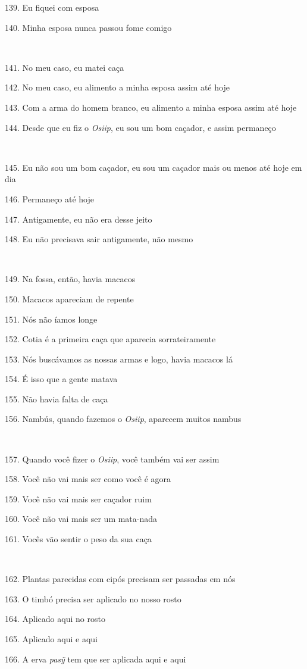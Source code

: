 139. Eu fiquei com esposa

140.  Minha esposa nunca passou fome comigo

~

141. No meu caso, eu matei caça

142. No meu caso, eu alimento a minha esposa assim até hoje

143. Com a arma do homem branco, eu alimento a minha esposa assim até hoje

144. Desde que eu fiz o \emph{Osiip}, eu sou um bom caçador, e assim permaneço

~

145. Eu não sou um bom caçador, eu sou um caçador mais ou menos até hoje em dia

146. Permaneço até hoje

147. Antigamente, eu não era desse jeito

148. Eu não precisava sair antigamente, não mesmo

~

149. Na fossa, então, havia macacos

150. Macacos apareciam de repente

151. Nós não íamos longe

152. Cotia é a primeira caça que aparecia sorrateiramente

153. Nós buscávamos as nossas armas e logo, havia macacos lá

154. É isso que a gente matava

155. Não havia falta de caça

156. Nambús, quando fazemos o \emph{Osiip}, aparecem muitos nambus

~

157. Quando você fizer o \emph{Osiip}, você também vai ser assim

158. Você não vai mais ser como você é agora

159. Você não vai mais ser caçador ruim

160. Você não vai mais ser um mata-nada

161. Vocês vão sentir o peso da sua caça

~

162. Plantas parecidas com cipós precisam ser passadas em nós

163. O timbó precisa ser aplicado no nosso rosto

164. Aplicado aqui no rosto

165. Aplicado aqui e aqui

166. A erva \emph{pasỹ} tem que ser aplicada aqui e aqui

